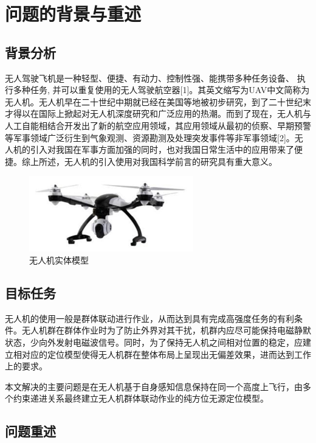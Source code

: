 \section{问题的背景与重述}

\subsection{背景分析}

无人驾驶飞机是一种轻型、便捷、有动力、控制性强、能携带多种任务设备、 执行多种任务, 并可以重复使用的无人驾驶航空器[1]。其英文缩写为UAV中文简称为无人机。无人机早在二十世纪中期就已经在美国等地被初步研究，到了二十世纪末才得以在国际上掀起对无人机深度研究和广泛应用的热潮。而到了现在，无人机与人工自能相结合开发出了新的航空应用领域，其应用领域从最初的侦察、早期预警等军事领域广泛衍生到气象观测、资源勘测及处理突发事件等非军事领域[2]。无人机的引入对我国在军事方面加强的同时，也对我国日常生活中的应用带来了便捷。综上所述，无人机的引入使用对我国科学前言的研究具有重大意义。

\begin{figure}
    \centering
    \includegraphics[scale=0.7]{../res/droneModel.png}
    \caption{无人机实体模型}
\end{figure}

\subsection{目标任务}

无人机的使用一般是群体联动进行作业，从而达到具有完成高强度任务的有利条件。无人机群在群体作业时为了防止外界对其干扰，机群内应尽可能保持电磁静默状态，少向外发射电磁波信号。同时，为了保持无人机之间相对位置的稳定，应建立相对应的定位模型使得无人机群在整体布局上呈现出无偏差效果，进而达到工作上的要求。

本文解决的主要问题是在无人机基于自身感知信息保持在同一个高度上飞行，由多个约束递进关系最终建立无人机群体联动作业的纯方位无源定位模型。

\subsection{问题重述}


